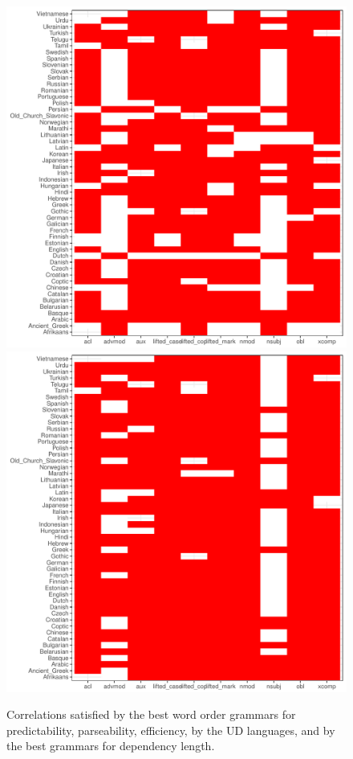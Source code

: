 \documentclass[12pt]{article}
\begin{document}
\begin{figure}
    
    \includegraphics[scale=.25]{../results/correlations/figures/coverage-ground.pdf}
    \includegraphics[scale=.25]{../results/correlations/figures/coverage-depl.pdf}
	\caption{Correlations satisfied by the best word order grammars for predictability, parseability, efficiency, by the UD languages, and by the best grammars for dependency length.}
    \label{fig:posterior-prevalence}
\end{figure}
\end{document}
